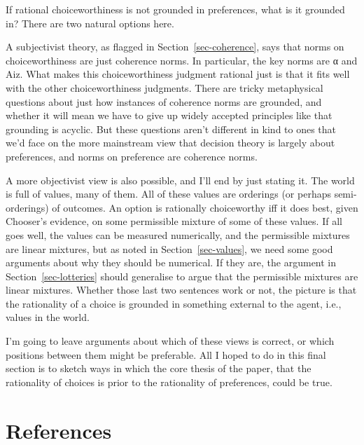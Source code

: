 \documentclass[
  11pt,
  letterpaper,
  DIV=11,
  numbers=noendperiod,
  twoside]{scrartcl}
\begin{document}
If rational choiceworthiness is not grounded in preferences, what is it
grounded in? There are two natural options here.

A subjectivist theory, as flagged in Section~\ref{sec-coherence}, says
that norms on choiceworthiness are just coherence norms. In particular,
the key norms are α and Aiz. What makes this choiceworthiness judgment
rational just is that it fits well with the other choiceworthiness
judgments. There are tricky metaphysical questions about just how
instances of coherence norms are grounded, and whether it will mean we
have to give up widely accepted principles like that grounding is
acyclic. But these questions aren't different in kind to ones that we'd
face on the more mainstream view that decision theory is largely about
preferences, and norms on preference are coherence norms.

A more objectivist view is also possible, and I'll end by just stating
it. The world is full of values, many of them. All of these values are
orderings (or perhaps semi-orderings) of outcomes. An option is
rationally choiceworthy iff it does best, given Chooser's evidence, on
some permissible mixture of some of these values. If all goes well, the
values can be measured numerically, and the permissible mixtures are
linear mixtures, but as noted in Section~\ref{sec-values}, we need some
good arguments about why they should be numerical. If they are, the
argument in Section~\ref{sec-lotteries} should generalise to argue that
the permissible mixtures are linear mixtures. Whether those last two
sentences work or not, the picture is that the rationality of a choice
is grounded in something external to the agent, i.e., values in the
world.

I'm going to leave arguments about which of these views is correct, or
which positions between them might be preferable. All I hoped to do in
this final section is to sketch ways in which the core thesis of the
paper, that the rationality of choices is prior to the rationality of
preferences, could be true.

\section*{References}\label{references}
\end{document}
